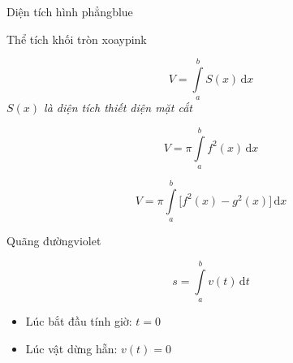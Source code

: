 \documentclass[12pt,a4paper,landscape]{book}
\begin{document}
\begin{multicols*}{3}
\begin{khung_trello}{Diện tích hình phẳng}{blue}
\begin{khung_trello_box}
			\end{khung_trello_box}
		\end{khung_trello}
		\begin{khung_trello}{Thể tích khối tròn xoay}{pink}
			\begin{khung_trello_box}
				$$V=\displaystyle\int\limits_{a}^{b}S(x)\mathrm{\,d}x$$
				\textit{$S(x)$ là diện tích thiết diện mặt cắt}
			\end{khung_trello_box}
			\begin{khung_trello_box}
				$$V=\pi\displaystyle\int\limits_{a}^{b}f^2(x)\mathrm{\,d}x$$
			\end{khung_trello_box}
			\begin{khung_trello_box}
				$$V=\pi\displaystyle\int\limits_{a}^{b}\big[f^2(x)-g^2(x)\big]\mathrm{\,d}x$$
			\end{khung_trello_box}
		\end{khung_trello}
		\begin{khung_trello}{Quãng đường}{violet}
			\begin{khung_trello_box}
				$$s=\displaystyle\int\limits_{a}^{b}v(t)\mathrm{\,d}t$$
				\begin{itemize}[leftmargin=5mm]
					\item Lúc bắt đầu tính giờ: $t=0$
					\item Lúc vật dừng hẵn: $v(t)=0$
				\end{itemize}
			\end{khung_trello_box}
		\end{khung_trello}
	\end{multicols*}
\end{document}
